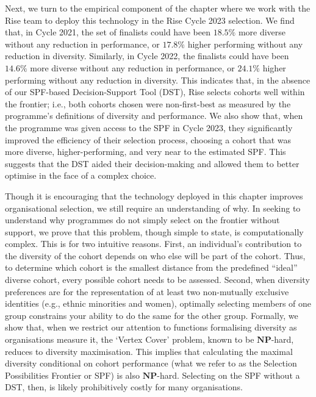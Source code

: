 Next, we turn to the empirical component of the chapter where we work with the Rise team to deploy this technology in the Rise Cycle 2023 selection. We find that, in Cycle 2021, the set of finalists could have been $18.5\%$ more diverse without any reduction in performance, or $17.8\%$ higher performing without any reduction in diversity. Similarly, in Cycle 2022, the finalists could have been $14.6\%$ more diverse without any reduction in performance, or $24.1\%$ higher performing without any reduction in diversity. This indicates that, in the absence of our SPF-based Decision-Support Tool (DST), Rise selects cohorts well within the frontier; i.e., both cohorts chosen were non-first-best as measured by the programme's definitions of diversity and performance. We also show that, when the programme was given access to the SPF in Cycle 2023, they significantly improved the efficiency of their selection process, choosing a cohort that was more diverse, higher-performing, and very near to the estimated SPF. This suggests that the DST aided their decision-making and allowed them to better optimise in the face of a complex choice.

Though it is encouraging that the technology deployed in this chapter improves organisational selection, we still require an understanding of why. In seeking to understand why programmes do not simply select on the frontier without support, we prove that this problem, though simple to state, is computationally complex. This is for two intuitive reasons. First, an individual's contribution to the diversity of the cohort depends on who else will be part of the cohort. Thus, to determine which cohort is the smallest distance from the predefined ``ideal'' diverse cohort, every possible cohort needs to be assessed. Second, when diversity preferences are for the representation of at least two non-mutually exclusive identities (e.g., ethnic minorities and women), optimally selecting members of one group constrains your ability to do the same for the other group. Formally, we show that, when we restrict our attention to functions formalising diversity as organisations measure it, the `Vertex Cover' problem, known to be $\mathbf{NP}$-hard, reduces to diversity maximisation. This implies that calculating the maximal diversity conditional on cohort performance (what we refer to as the Selection Possibilities Frontier or SPF) is also $\mathbf{NP}$-hard. Selecting on the SPF without a DST, then, is likely prohibitively costly for many organisations.

